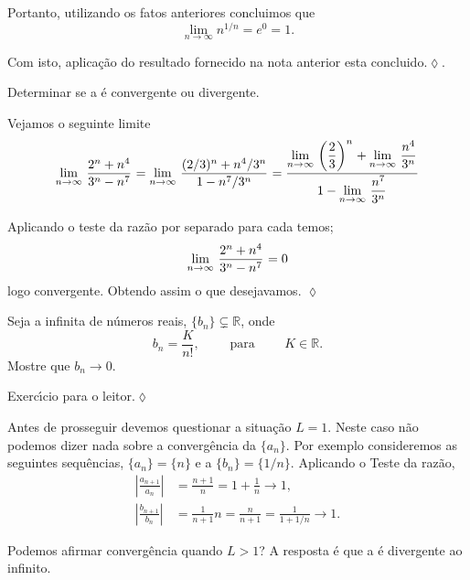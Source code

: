 Portanto, utilizando os fatos anteriores concluimos que
\begin{equation*}
    \lim_{n\to\infty}n^{1/n}=e^0=1.
\end{equation*}

Com isto, aplica\c{c}\~{a}o do resultado fornecido na nota anterior esta concluido.\hfill \(\lozenge\).

\begin{exer}
Determinar se a \seq {} \'{e}
convergente ou divergente.
\end{exer}

\solo Vejamos o seguinte limite
\begin{equation*}
  \displaystyle{\lim_{n\to \infty}\,{\frac{2^n+n^4}{3^n-n^7}}_{}}=\displaystyle{\lim_{n\to \infty}\,{\frac{(2/3)^n+n^4/3^n}{1-n^7/3^n}}_{}}
  =\frac{\displaystyle{\lim_{n\to \infty}\,{\left(\frac{2}{3}\right)^n}_{}}+\displaystyle{\lim_{n\to \infty}\,{\frac{n^4}{3^n}}_{}}}{1-\displaystyle{\lim_{n\to \infty}\,{\frac{n^7}{3^n}}_{}}}
\end{equation*}

Aplicando o teste da raz\~{a}o por separado para cada \seq temos;
\begin{equation*}
  \displaystyle{\lim_{n\to \infty}\,{\frac{2^n+n^4}{3^n-n^7}}_{}}=0
\end{equation*}
logo convergente. Obtendo assim o que desejavamos. \hfill \(\lozenge\)

\begin{exer}
Seja a \seq infinita de n\'{u}meros reais, $\{b_n \}\subsetneq \mathbb{R}$, onde
\begin{equation*}
    b_n=\frac{K}{n!}, \qquad\text{ para }\qquad K\in \mathbb{R}.
\end{equation*}
Mostre que $b_n\to 0$.
\end{exer}

\solo Exerc\'{\i}cio para o leitor.\hfill \(\lozenge\)


Antes de prosseguir devemos  questionar a situa\c{c}\~{a}o $L=1$. Neste caso
n\~{a}o podemos dizer nada sobre a converg\^{e}ncia da \seq $\{a_n\}$. Por
exemplo consideremos as seguintes sequ\^{e}ncias, $\{a_n\}=\{n\}$ e a
\seq $\{b_n\}=\{1/n\}$. Aplicando o Teste da raz\~{a}o,
\begin{align*}
    \left|\frac{a_{n+1}}{a_n}\right|&=\frac{n+1}{n}=1+\frac{1}{n}\to 1,\\[2ex]
\left|\frac{b_{n+1}}{b_n}\right|&=\frac{1}{n+1}n=\frac{n}{n+1}=\frac{1}{1+1/n}\to
1.
\end{align*}

Podemos  afirmar  converg\^{e}ncia quando $L>1$? A resposta \'{e} que a
\seq \'{e} divergente ao infinito.

